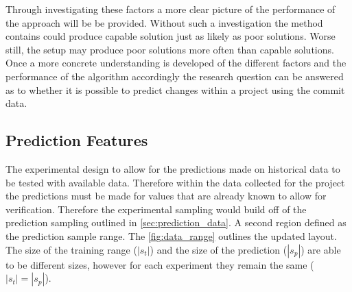 Through investigating these factors a more clear picture of the performance of the approach will be be provided. Without such a investigation the method contains could produce capable solution just as likely as poor solutions. Worse still, the setup may produce poor solutions more often than capable solutions. Once a more concrete understanding is developed of the different factors and the performance of the algorithm accordingly the research question can be answered as to whether it is possible to predict changes within a project using the commit data.

\subsection{Prediction Features}










The experimental design to allow for the predictions made on historical data to be tested with available data. Therefore within the data collected for the project the predictions must be made for values that are already known to allow for verification. Therefore the experimental sampling would build off of the prediction sampling outlined in \autoref{sec:prediction_data}. A second region defined as the prediction sample range. The \autoref{fig:data_range} outlines the updated layout. The size of the training range ($|s_t|$) and the size of the prediction ($|s_p|$) are able to be different sizes, however for each experiment they remain the same ($|s_t| = |s_p|$).

